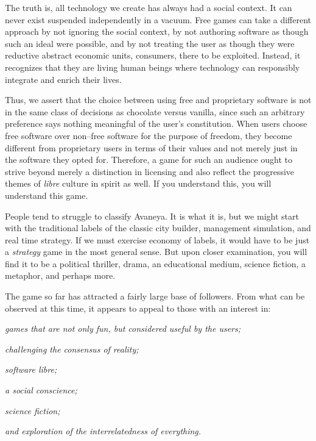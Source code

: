 The truth is, all technology we create has always had a social context. It can never exist suspended independently in a vacuum. Free games can take a different approach by not ignoring the social context, by not authoring software as though such an ideal were possible, and by not treating the user as though they were reductive abstract economic units, consumers, there to be exploited. Instead, it recognizes that they are living human beings where technology can responsibly integrate and enrich their lives. 

Thus, we assert that the choice between using free and proprietary software is not in the same class of decisions as chocolate versus vanilla, since such an arbitrary preference says nothing meaningful of the user's constitution. When users choose free software over non--free software for the purpose of freedom, they become different from proprietary users in terms of their values and not merely just in the software they opted for. Therefore, a game for such an audience ought to strive beyond merely a distinction in licensing and also reflect the progressive themes of {\it libre} culture in spirit as well. If you understand this, you will understand this game.

People tend to struggle to classify Avaneya. It is what it is, but we might start with the traditional labels of the classic city builder, management simulation, and real time strategy. If we must exercise economy of labels, it would have to be just a {\it strategy} game in the most general sense. But upon closer examination, you will find it to be a political thriller, drama, an educational medium, science fiction, a metaphor, and perhaps more.

The game so far has attracted a fairly large base of followers. From what can be observed at this time, it appears to appeal to those with an interest in:

\startitemize[4]
\item
{\it games that are not only fun, but considered useful by the users;}
\item
{\it challenging the consensus of reality;}
\item
{\it software libre;}
\item
{\it a social conscience;}
\item
{\it science fiction;}
\item
{\it and exploration of the interrelatedness of everything.}
\stopitemize

